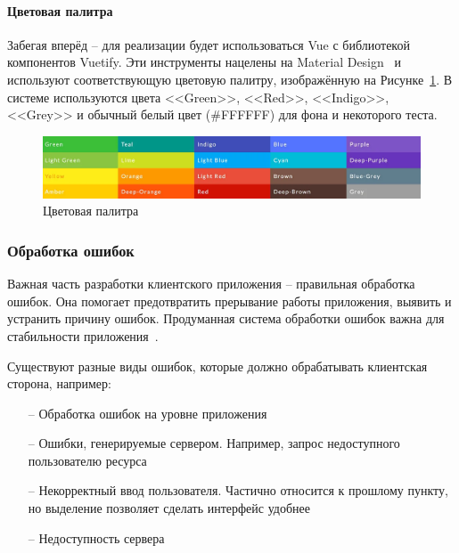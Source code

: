 \documentclass[a4paper,article]{article}
\begin{document}
\begin{sloppypar}
    \newpage
    
    \paragraph{Цветовая палитра}
    
    Забегая вперёд -- для реализации будет использоваться Vue с библиотекой компонентов Vuetify. Эти инструменты нацелены на Material Design~\cite{vuetify} и используют соответствующую цветовую палитру, изображённую на Рисунке~\ref{fig:colorscheme}. В системе используются цвета <<Green>>, <<Red>>, <<Indigo>>, <<Grey>> и обычный белый цвет (\#FFFFFF) для фона и некоторого теста.
    
    \begin{figure}[h]
        \centering
        \includegraphics[width=0.8\linewidth]{Цветовая палитра.png}
        \caption{\centering Цветовая палитра}
        \label{fig:colorscheme}
    \end{figure}
    
    \vspace{-1em}

    \subsubsection{Обработка ошибок}\label{Проектирование клиента. Обработка ошибок}

    Важная часть разработки клиентского приложения -- правильная обработка ошибок. Она помогает предотвратить прерывание работы приложения, выявить и устранить причину ошибок. Продуманная система обработки ошибок важна для стабильности приложения~\cite{vuejs}.

    Существуют разные виды ошибок, которые должно обрабатывать клиентская сторона, например:

    \begin{itemize}[nolistsep]
        \item[--] Обработка ошибок на уровне приложения
        \item[--] Ошибки, генерируемые сервером. Например, запрос недоступного пользователю ресурса
        \item[--] Некорректный ввод пользователя. Частично относится к прошлому пункту, но выделение позволяет сделать интерфейс удобнее
        \item[--] Недоступность сервера
    \end{itemize}


\end{sloppypar}
\end{document}
